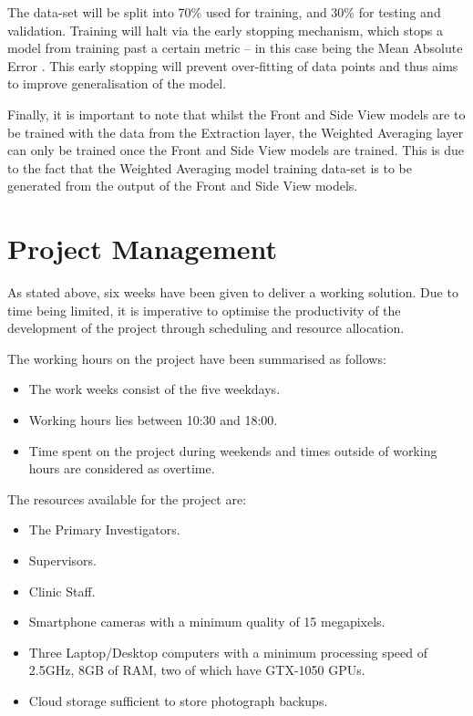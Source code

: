 The data-set will be split into 70\% used for training, and 30\% for testing and validation.
Training will halt via the early stopping mechanism, which stops a model from training past a certain metric -- in this case being the Mean Absolute Error \cite{bmifromface}.
This early stopping will prevent over-fitting of data points and thus aims to improve generalisation of the model.

Finally, it is important to note that whilst the Front and Side View models are to be trained with the data from the Extraction layer, the Weighted Averaging layer can only be trained once the Front and Side View models are trained.
This is due to the fact that the Weighted Averaging model training data-set is to be generated from the output of the Front and Side View models.
\section{Project Management}
As stated above, six weeks have been given to deliver a working solution.
Due to time being limited, it is imperative to optimise the productivity of the development of the project through scheduling and resource allocation.

The working hours on the project have been summarised as follows: 
\begin{itemize}
    \item The work weeks consist of the five weekdays.
    \item Working hours lies between 10:30 and 18:00.
    \item Time spent on the project during weekends and times outside of working hours are considered as overtime.
\end{itemize}
	 
The resources available for the project are:
\begin{itemize}
    \item The Primary Investigators.
    \item Supervisors.
    \item Clinic Staff.
    \item Smartphone cameras with a minimum quality of 15 megapixels.
    \item Three Laptop/Desktop computers with a minimum processing speed of 2.5GHz, 8GB of RAM, two of which have GTX-1050 GPUs.
    \item Cloud storage sufficient to store photograph backups.
\end{itemize}

